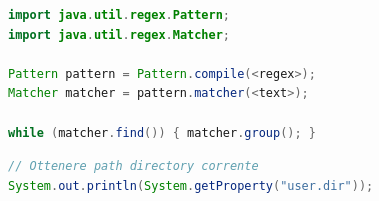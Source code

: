 \begin{lstlisting}[language = java, frame = none]
import java.util.regex.Pattern;
import java.util.regex.Matcher;

Pattern pattern = Pattern.compile(<regex>);
Matcher matcher = pattern.matcher(<text>);

while (matcher.find()) { matcher.group(); }
\end{lstlisting}

\begin{lstlisting}[language = java, frame = none]
// Ottenere path directory corrente
System.out.println(System.getProperty("user.dir"));
\end{lstlisting}



